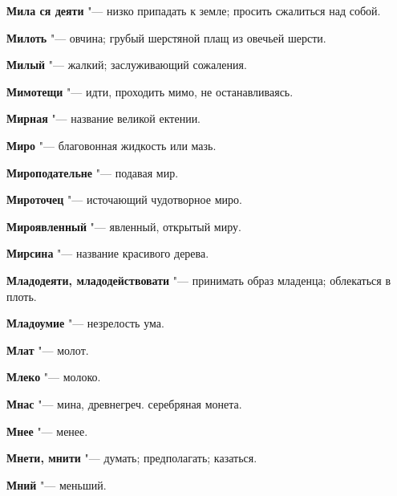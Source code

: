 \begin{mymulticols}{2}
\noindent\textbf{Мила ся деяти} "--- низко припадать к земле; просить сжалиться над собой. 




\noindent\textbf{Милоть} "--- овчина; грубый шерстяной плащ из овечьей шерсти. 




\noindent\textbf{Милый} "--- жалкий; заслуживающий сожаления. 




\noindent\textbf{Мимотещи} "--- идти, проходить мимо, не останавливаясь. 




\noindent\textbf{Мирная} "--- название великой ектении. 




\noindent\textbf{Миро} "--- благовонная жидкость или мазь. 




\noindent\textbf{Мироподательне} "--- подавая мир. 




\noindent\textbf{Мироточец} "--- источающий чудотворное миро. 




\noindent\textbf{Мироявленный} "--- явленный, открытый миру. 




\noindent\textbf{Мирсина} "--- название красивого дерева. 




\noindent\textbf{Младодеяти, младодействовати} "--- принимать образ младенца; облекаться в плоть. 




\noindent\textbf{Младоумие} "--- незрелость ума. 




\noindent\textbf{Млат} "--- молот. 




\noindent\textbf{Млеко} "--- молоко. 




\noindent\textbf{Мнас} "--- мина, древнегреч. серебряная монета. 




\noindent\textbf{Мнее} "--- менее. 




\noindent\textbf{Мнети, мнити} "--- думать; предполагать; казаться. 




\noindent\textbf{Мний} "--- меньший. 





\end{mymulticols}
